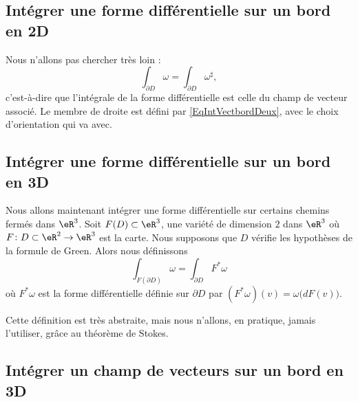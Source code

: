 \subsection{Intégrer une forme différentielle sur un bord en 2D}

Nous n'allons pas chercher très loin :
\begin{equation}
	\int_{\partial D}\omega=\int_{\partial D}\omega^{\sharp},
\end{equation}
c'est-à-dire que l'intégrale de la forme différentielle est celle du champ de vecteur associé. Le membre de droite est défini par \eqref{EqIntVectbordDeux}, avec le choix d'orientation qui va avec.

\subsection{Intégrer une forme différentielle sur un bord en 3D}

Nous allons maintenant intégrer une forme différentielle sur certains chemins fermés dans \( \eR^3\). Soit \( F(D)\subset\eR^3\), une variété de dimension \( 2\) dans \( \eR^3\) où \( F\colon D\subset\eR^2\to \eR^3\) est la carte. Nous supposons que \( D\) vérifie les hypothèses de la formule de Green. Alors nous définissons
\begin{equation}		\label{EqDefIntTroisForBord}
	\int_{F(\partial D)}\omega = \int_{\partial D} F^*\omega
\end{equation}
où \( F^*\omega\) est la forme différentielle définie sur \( \partial D\) par \( (F^*\omega)(v)=\omega\big( dF(v) \big)\).

Cette définition est très abstraite, mais nous n'allons, en pratique, jamais l'utiliser, grâce au théorème de Stokes.

\subsection{Intégrer un champ de vecteurs sur un bord en 3D}

